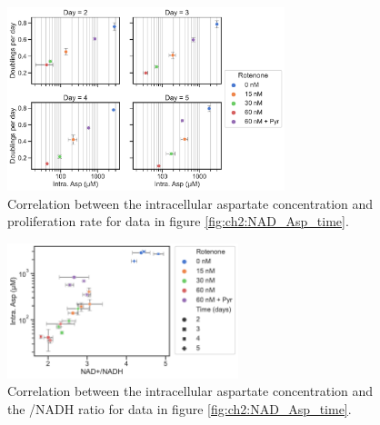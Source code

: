 \begin{figure}
    \centering
    \includegraphics[width=0.72\textwidth]{figures/chap2/intra-asp-prlfr_rep1-byday.pdf}
    \caption[Aspartate levels correlates with proliferation rate.]{
    Correlation between the intracellular aspartate concentration and proliferation rate for data in figure \ref{fig:ch2:NAD_Asp_time}.
    }
    \label{fig:ch2:Asp_by_day}
\end{figure}

\begin{figure}
    \centering
    \includegraphics[width=0.6\textwidth]{figures/chap2/NAD-NADH-Asp_rep1-2.pdf}
    \caption[Aspartate and \NAD{}/NADH ratios are correlated.]{
    Correlation between the intracellular aspartate concentration and the \NAD{}/NADH ratio for data in figure \ref{fig:ch2:NAD_Asp_time}.
    }
    \label{fig:ch2:NAD_Asp_corr}
\end{figure}




